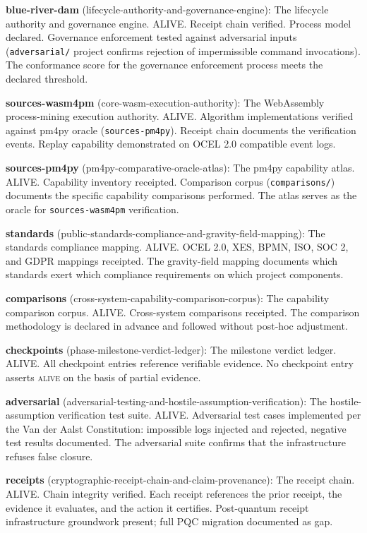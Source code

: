 \textbf{blue-river-dam} (lifecycle-authority-and-governance-engine): The lifecycle authority and governance engine. ALIVE. Receipt chain verified. Process model declared. Governance enforcement tested against adversarial inputs (\texttt{adversarial/} project confirms rejection of impermissible command invocations). The conformance score for the governance enforcement process meets the declared threshold.

\textbf{sources-wasm4pm} (core-wasm-execution-authority): The WebAssembly process-mining execution authority. ALIVE. Algorithm implementations verified against pm4py oracle (\texttt{sources-pm4py}). Receipt chain documents the verification events. Replay capability demonstrated on OCEL 2.0 compatible event logs.

\textbf{sources-pm4py} (pm4py-comparative-oracle-atlas): The pm4py capability atlas. ALIVE. Capability inventory receipted. Comparison corpus (\texttt{comparisons/}) documents the specific capability comparisons performed. The atlas serves as the oracle for \texttt{sources-wasm4pm} verification.

\textbf{standards} (public-standards-compliance-and-gravity-field-mapping): The standards compliance mapping. ALIVE. OCEL 2.0, XES, BPMN, ISO, SOC 2, and GDPR mappings receipted. The gravity-field mapping documents which standards exert which compliance requirements on which project components.

\textbf{comparisons} (cross-system-capability-comparison-corpus): The capability comparison corpus. ALIVE. Cross-system comparisons receipted. The comparison methodology is declared in advance and followed without post-hoc adjustment.

\textbf{checkpoints} (phase-milestone-verdict-ledger): The milestone verdict ledger. ALIVE. All checkpoint entries reference verifiable evidence. No checkpoint entry asserts \textsc{alive} on the basis of partial evidence.

\textbf{adversarial} (adversarial-testing-and-hostile-assumption-verification): The hostile-assumption verification test suite. ALIVE. Adversarial test cases implemented per the Van der Aalst Constitution: impossible logs injected and rejected, negative test results documented. The adversarial suite confirms that the infrastructure refuses false closure.

\textbf{receipts} (cryptographic-receipt-chain-and-claim-provenance): The receipt chain. ALIVE. Chain integrity verified. Each receipt references the prior receipt, the evidence it evaluates, and the action it certifies. Post-quantum receipt infrastructure groundwork present; full PQC migration documented as gap.

